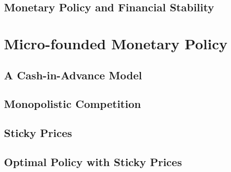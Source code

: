 \documentclass[11pt,a4paper,oneside]{book}
\begin{document}

\chapter{Monetary Policy and Financial Stability}


\part{Micro-founded Monetary Policy}
\chapter{A Cash-in-Advance Model}


\chapter{Monopolistic Competition}


\chapter{Sticky Prices}


\chapter{Optimal Policy with Sticky Prices}




\backmatter

\end{document}
